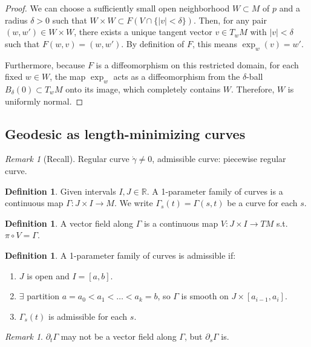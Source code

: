 \documentclass[11pt, a4paper]{article}
\theoremstyle{plain}
\theoremstyle{definition}
\newtheorem{definition}[theorem]{Definition}
\theoremstyle{remark}
\newtheorem{remark}[theorem]{Remark}
\begin{document}
\begin{proof}
We can choose a sufficiently small open neighborhood $W \subset M$ of $p$ and a radius $\delta > 0$ such that $W \times W \subset F(V \cap \{|v| < \delta\})$. 
Then, for any pair $(w, w') \in W \times W$, there exists a unique tangent vector $v \in T_w M$ with $|v| < \delta$ such that $F(w, v) = (w, w')$. By definition of $F$, this means $\exp_w(v) = w'$.

Furthermore, because $F$ is a diffeomorphism on this restricted domain, for each fixed $w \in W$, the map $\exp_w$ acts as a diffeomorphism from the $\delta$-ball $B_\delta(0) \subset T_w M$ onto its image, which completely contains $W$. Therefore, $W$ is uniformly normal.
\end{proof}

\subsection{Geodesic as length-minimizing curves}

\begin{remark}[Recall]
Regular curve $\dot{\gamma} \neq 0$, admissible curve: piecewise regular curve.
\end{remark}

\begin{definition}
Given intervals $I, J \in \mathbb{R}$. A 1-parameter family of curves is a continuous map $\Gamma : J \times I \to M$. 
We write $\Gamma_s(t) = \Gamma(s, t)$ be a curve for each $s$.
\end{definition}

\begin{definition}
A vector field along $\Gamma$ is a continuous map $V : J \times I \to TM$ s.t. $\pi \circ V = \Gamma$.
\end{definition}

\begin{definition}
A 1-parameter family of curves is admissible if:
\begin{enumerate}
    \item $J$ is open and $I = [a, b]$.
    \item $\exists$ partition $a = a_0 < a_1 < \dots < a_k = b$, so $\Gamma$ is smooth on $J \times [a_{i-1}, a_i]$.
    \item $\Gamma_s(t)$ is admissible for each $s$.
\end{enumerate}
\end{definition}

\begin{remark}
$\partial_t \Gamma$ may not be a vector field along $\Gamma$, but $\partial_s \Gamma$ is.
\end{remark}
\end{document}

